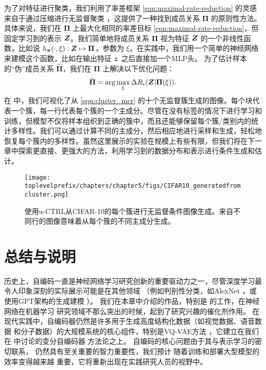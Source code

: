 \documentclass[../../book-main.tex]{subfiles}
\begin{document}
为了对特征进行聚类，我们利用了率差框架 \eqref{eqn:maximal-rate-reduction} 的灵感来自于通过压缩进行无监督聚类 \cite{ma2007segmentation}，这提供了一种找到成员关系 $\bm \Pi$ 的原则性方法。
具体来说，我们在 $\bm \Pi$ 上最大化相同的率差目标 \eqref{eqn:maximal-rate-reduction}，但固定学习到的表示 $\bm{Z}$。我们简单地将成员关系 $\bm \Pi$ 视为特征 $\bm{Z}$ 的一个非线性函数，比如说 $h_{\bm \pi}(\cdot,\xi):\bm{Z} \mapsto \bm \Pi$，参数为 $\xi$。在实践中，我们用一个简单的神经网络来建模这个函数，比如在输出特征 $\bm{z}$ 之后直接加一个MLP头。
为了估计样本的“伪”成员关系 $\hat{\bm \Pi}$，我们在 $\bm \Pi$ 上解决以下优化问题：
\begin{align}
    \hat{\bm \Pi} = \arg\max_{\xi} \Delta R_\epsilon(\bm{Z}| \bm \Pi(\xi)).
\label{eqn:cluster_mcr}
\end{align}
在  中，我们可视化了从 \eqref{eqn:cluster_mcr} 的十个无监督簇生成的图像。每个块代表一个簇，每一行代表每个簇的一个主成分。尽管在没有标签的情况下进行学习和训练，但模型不仅将样本组织到正确的簇中，而且还能够保留每个簇/类别内的统计多样性。我们可以通过计算不同的主成分，然后相应地进行采样和生成，轻松地恢复每个簇内的多样性。虽然这里展示的实验在规模上有些有限，但我们将在下一章中探索更直接、更强大的方法，利用学习到的数据分布和表示进行条件生成和估计。
\begin{figure}[t]
    \footnotesize
    \centering
    \texttt{[image: \\toplevelprefix/chapters/chapter5/figs/CIFAR10\_generatedfromcluster.png]}
    \caption{\small 使用u-CTRL从CIFAR-10的每个簇进行无监督条件图像生成。来自不同行的图像意味着从每个簇的不同主成分生成。}
    \label{fig:vis_clustering}
\end{figure}





\section{总结与说明}
历史上，自编码一直是神经网络学习研究创新的重要驱动力之一，尽管深度学习最令人印象深刻的实际展示可能是在其他领域
（例如判别性分类，如AlexNet
\cite{krizhevsky2012imagenet}，或使用GPT架构的生成建模
\cite{brown2020language}）。
我们在本章中介绍的作品，特别是
\cite{Hinton504} 的工作，在神经网络在机器学习
研究领域不那么突出的时候，起到了研究兴趣的催化剂作用。
在现代实践中，自编码器仍然是许多用于生成高度结构化数据（如视觉数据、语音数据
和分子数据）的大规模系统的核心组件，特别是VQ-VAE方法
\cite{van-den-Oord2017-jr}，它建立在我们
在  中讨论的变分自编码器
方法论之上。
自编码的核心问题由于其与表示学习的密切联系，
仍然具有至关重要的智力重要性，我们预计
随着训练和部署大型模型的效率变得越来越
重要，它将重新出现在实践研究人员的视野中。
\end{document}
